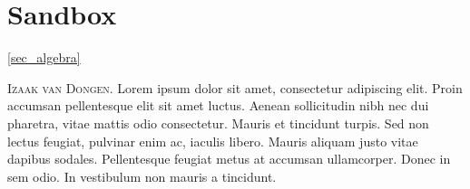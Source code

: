 \section{Sandbox}

\ref{sec_algebra}

\lettrine{\color{RoyalBlue4}I}{zaak van Dongen}.
 Lorem ipsum dolor sit amet, consectetur adipiscing elit. Proin accumsan
 pellentesque elit sit amet luctus. Aenean sollicitudin nibh nec dui
 pharetra, vitae mattis odio consectetur. Mauris et tincidunt turpis. Sed non
 lectus feugiat, pulvinar enim ac, iaculis libero. Mauris aliquam justo vitae
 dapibus sodales. Pellentesque feugiat metus at accumsan ullamcorper. Donec
 in sem odio. In vestibulum non mauris a tincidunt.

